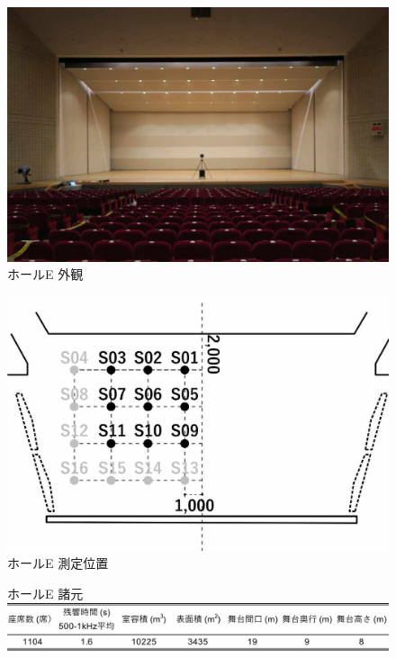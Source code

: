 \documentclass[11pt,a4j]{jreport}
\begin{document}
\newpage
\begin{figure}[H]
  \begin{minipage}{.5\linewidth} %
    \centering
    \includegraphics[width=.7\linewidth]{images/measuredHalls/resized/picture_e.jpg}
    \\ホールE 外観
  \end{minipage}%
  \begin{minipage}{.5\linewidth} %
    \centering
    \includegraphics[width=.7\linewidth]{images/measuredHalls/resized/flat_e.jpg}
    \\ホールE 測定位置
  \end{minipage}

  \begin{minipage}{1\linewidth}
    \centering
    ホールE 諸元\\
    \includegraphics[width=.8\linewidth]{images/measuredHalls/informationTable/e.pdf}
  \end{minipage}
\end{figure}
\end{document}
